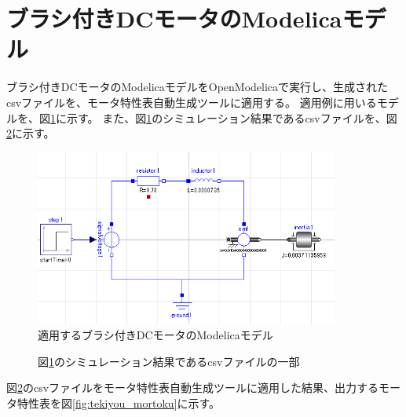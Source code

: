 \section{ブラシ付きDCモータのModelicaモデル}
ブラシ付きDCモータのModelicaモデルをOpenModelicaで実行し、生成されたcsvファイルを、モータ特性表自動生成ツールに適用する。
適用例に用いるモデルを、図\ref{fig:tekiyou_tanntai}に示す。
また、図\ref{fig:tekiyou_tanntai}のシミュレーション結果であるcsvファイルを、図\ref{fig:tekiyou_csv}に示す。
\begin{figure}[t]
	\centering
	\includegraphics[width=10cm]{./Image/tekiyou_tanntai.png}
	\caption{適用するブラシ付きDCモータのModelicaモデル}
	\label{fig:tekiyou_tanntai}
\end{figure}
\begin{figure}[t]
	\centering
	\fbox{
    }
	\caption{図\ref{fig:tekiyou_tanntai}のシミュレーション結果であるcsvファイルの一部}
	\label{fig:tekiyou_csv}
\end{figure}
図\ref{fig:tekiyou_csv}のcsvファイルをモータ特性表自動生成ツールに適用した結果、出力するモータ特性表を図\ref{fig:tekiyou_mortoku}に示す。
